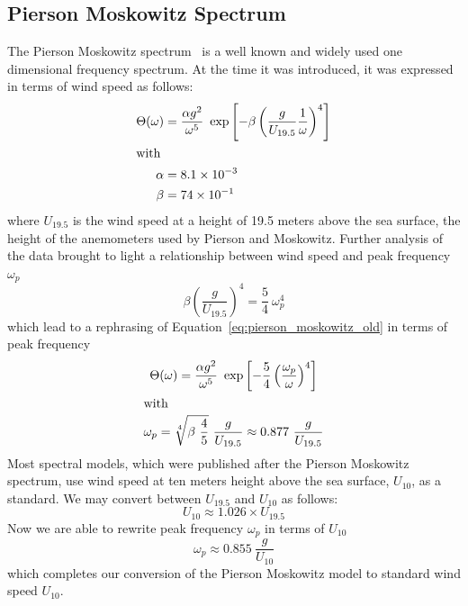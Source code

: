 \subsection{Pierson Moskowitz Spectrum}
\label{sec:pierson_moskowitz}
%
The Pierson Moskowitz spectrum~\cite{article:PiersonMoskowitz1964} is a well 
known and widely used one dimensional frequency spectrum. At the time it was 
introduced, it was expressed in terms of wind speed as follows:
\begin{subequations}
\label{eq:pierson_moskowitz_old}
\begin{align}
 \Theta(\omega) &= \frac{\alpha
g^2}{\omega^5}~\exp\left[-\beta\left(\frac{g}{U_{19.5}}\frac{1}{\omega}
\right)^4\right ]\\
\intertext{with}
\alpha &= 8.1 \times 10^{-3}\\
\beta &= 74 \times 10^{-1}
\end{align}
\end{subequations}
where $U_{19.5}$ is the wind speed at a height of 19.5 meters above the sea
surface, the height of the anemometers used by Pierson and Moskowitz. Further
analysis of the data brought to light a relationship between wind speed and
peak frequency $\omega_p$
\begin{equation}
 \beta\left(\frac{g}{U_{19.5}}\right)^4 = \frac{5}{4}~\omega_p^4
\end{equation}
which lead to a rephrasing of Equation~\ref{eq:pierson_moskowitz_old} in terms
of peak frequency
\begin{subequations}
\label{eq:pierson_moskowitz}
\begin{gather}
 \Theta(\omega) = \frac{\alpha
g^2}{\omega^5}~\exp\left[-\frac{5}{4}\left(\frac{\omega_p}{\omega}
\right)^4\right ]\\
\intertext{with}
\omega_p = \sqrt[4]{\beta~\frac{4}{5}}~\frac{g}{U_{19.5}} \approx
0.877~\frac{g}{U_{19.5}}
\end{gather}
\end{subequations}
Most spectral models, which were published after the Pierson Moskowitz spectrum,
use wind speed at ten meters height above the sea surface, $U_{10}$, as a 
standard. We may convert between $U_{19.5}$ and $U_{10}$ as follows:
\begin{equation}
 U_{10} \approx 1.026\times U_{19.5}
\end{equation}
Now we are able to rewrite peak frequency $\omega_p$ in terms of $U_{10}$
\begin{equation}
 \omega_p \approx 0.855~\frac{g}{U_{10}}
\end{equation}
which completes our conversion of the Pierson Moskowitz model to standard wind 
speed $U_{10}$.\\

